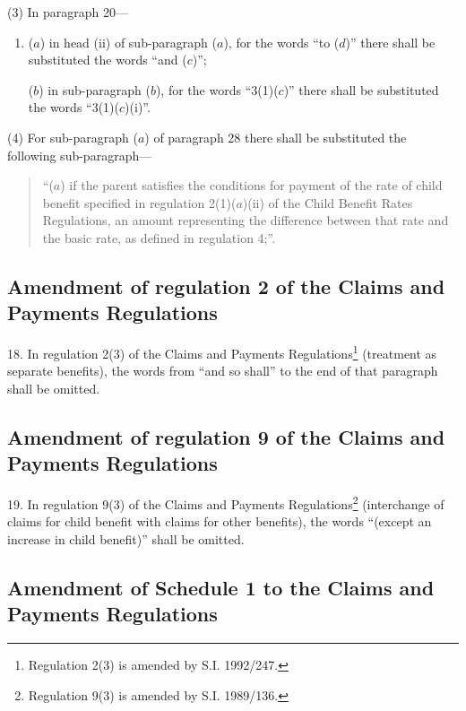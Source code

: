 \documentclass[12pt,a4paper]{article}
\begin{document}
(3) In paragraph 20—
\begin{enumerate}\item[]
($a$) in head (ii) of sub-paragraph ($a$), for the words “to ($d$)” there shall be substituted the words “and ($c$)”;

($b$) in sub-paragraph ($b$), for the words “3(1)($c$)” there shall be substituted the words “3(1)($c$)(i)”.
\end{enumerate}

(4) For sub-paragraph ($a$) of paragraph 28 there shall be substituted the following sub-paragraph—
\begin{quotation}
“($a$) if the parent satisfies the conditions for payment of the rate of child benefit specified in regulation 2(1)($a$)(ii) of the Child Benefit Rates Regulations, an amount representing the difference between that rate and the basic rate, as defined in regulation 4;”.
\end{quotation}

\subsection[18. Amendment of regulation 2 of the Claims and Payments Regulations]{Amendment of regulation 2 of the Claims and Payments Regulations}

18.  In regulation 2(3) of the Claims and Payments Regulations\footnote{\frenchspacing Regulation 2(3) is amended by S.I. 1992/247.} (treatment as separate benefits), the words from “and so shall” to the end of that paragraph shall be omitted.

\subsection[19. Amendment of regulation 9 of the Claims and Payments Regulations]{Amendment of regulation 9 of the Claims and Payments Regulations}

19.  In regulation 9(3) of the Claims and Payments Regulations\footnote{\frenchspacing Regulation 9(3) is amended by S.I. 1989/136.} (interchange of claims for child benefit with claims for other benefits), the words “(except an increase in child benefit)” shall be omitted.

\subsection[20. Amendment of Schedule 1 to the Claims and Payments Regulations]{Amendment of Schedule 1 to the Claims and Payments Regulations}
\end{document}
